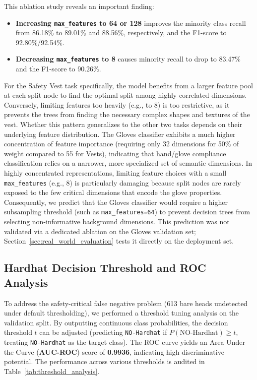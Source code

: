 \documentclass[11pt,a4paper]{article}
\begin{document}
This ablation study reveals an important finding:
\begin{itemize}
\item \textbf{Increasing \texttt{max\_features} to 64 or 128} improves the minority class recall from 86.18\% to 89.01\% and 88.56\%, respectively, and the F1-score to 92.80\%/92.54\%.
\item \textbf{Decreasing \texttt{max\_features} to 8} causes minority recall to drop to 83.47\% and the F1-score to 90.26\%.
\end{itemize}

For the Safety Vest task specifically, the model benefits from a larger feature pool at each split node to find the optimal split among highly correlated dimensions. Conversely, limiting features too heavily (e.g., to 8) is too restrictive, as it prevents the trees from finding the necessary complex shapes and textures of the vest. Whether this pattern generalizes to the other two tasks depends on their underlying feature distribution. The Gloves classifier exhibits a much higher concentration of feature importance (requiring only 32 dimensions for 50\% of weight compared to 55 for Vests), indicating that hand/glove compliance classification relies on a narrower, more specialized set of semantic dimensions. In highly concentrated representations, limiting feature choices with a small \texttt{max\_features} (e.g., 8) is particularly damaging because split nodes are rarely exposed to the few critical dimensions that encode the glove properties. Consequently, we predict that the Gloves classifier would require a higher subsampling threshold (such as \texttt{max\_features=64}) to prevent decision trees from selecting non-informative background dimensions. This prediction was not validated via a dedicated ablation on the Gloves validation set; Section~\ref{sec:real_world_evaluation} tests it directly on the deployment set.

\subsection{Hardhat Decision Threshold and ROC Analysis}
To address the safety-critical false negative problem (613 bare heads undetected under default thresholding), we performed a threshold tuning analysis on the validation split. By outputting continuous class probabilities, the decision threshold $t$ can be adjusted (predicting \texttt{NO-Hardhat} if $P(\text{NO-Hardhat}) \ge t$, treating \texttt{NO-Hardhat} as the target class). The ROC curve yields an Area Under the Curve (\textbf{AUC-ROC}) score of \textbf{0.9936}, indicating high discriminative potential. The performance across various thresholds is audited in Table~\ref{tab:threshold_analysis}.
\end{document}

